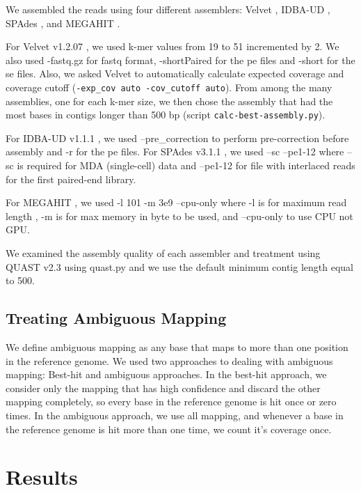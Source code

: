 We assembled the reads using four different assemblers: Velvet \cite{velvet}, IDBA-UD \cite{idba}, SPAdes \cite{spades}, and MEGAHIT \cite{megahit}.

For Velvet v1.2.07  \cite{ velvet}, we used k-mer values from 19 to 51
incremented by 2. We also used -fastq.gz for fastq format,
-shortPaired for the pe files and -short for the se files. Also, we
asked Velvet to automatically calculate expected coverage and coverage
cutoff ({\tt -exp\_cov auto -cov\_cutoff auto}).
From among the many assemblies, one for each k-mer size,
we then chose the assembly that had the most bases in contigs longer than
500 bp (script {\tt calc-best-assembly.py}).

For IDBA-UD v1.1.1 \cite{idba},  we used  --pre\_correction to perform pre-correction before assembly and -r for the pe files. 
For SPAdes v3.1.1 \cite{spades}, we used --sc --pe1-12   where --sc is required for MDA (single-cell) data  and --pe1-12  for file with interlaced reads for the first paired-end library.%

For MEGAHIT \cite{megahit}, we used -l 101 -m 3e9 --cpu-only where -l is for maximum read length , -m is for max memory in byte to be used, and --cpu-only to use CPU not GPU.


We examined the assembly quality of each assembler and treatment using
QUAST v2.3 \cite{quast} using quast.py and we use the default minimum
contig length equal to 500.



\subsection*{Treating Ambiguous Mapping} 

We define ambiguous mapping as any base that maps to more than one position in the reference genome.  We used two approaches to dealing with ambiguous mapping: 
Best-hit and ambiguous approaches. In the best-hit approach, we  consider only the mapping that has high confidence and discard the other mapping completely, so every base in the reference genome is hit once or zero times.  In the ambiguous approach, we use all mapping, and whenever a base in the reference genome is hit more than one time, we count it's coverage once. 


\section*{Results}

